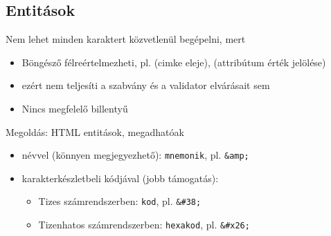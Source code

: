 \subsection{Entitások}

\begin{frame}
  Nem lehet minden karaktert közvetlenül begépelni, mert
  \begin{itemize}
    \item Böngésző félreértelmezheti, pl. \kiemel{\texttt{<}} (cimke eleje),  (attribútum érték jelölése)
    \item ezért nem teljesíti a szabvány és a validator elvárásait sem
    \item Nincs megfelelő billentyű
  \end{itemize}
  Megoldás: HTML entitások, megadhatóak
  \begin{itemize}
    \item névvel (könnyen megjegyezhető): \texttt{\kiemel{\&}mnemonik\kiemel{;}}, pl. \texttt{\&amp;}
    \item karakterkészletbeli kódjával (jobb támogatás): 
    \begin{itemize}
      \item Tizes számrendszerben: \texttt{\kiemel{\&\#}kod\kiemel{;}}, pl. \texttt{\&\#38;}
      \item Tizenhatos számrendszerben: \texttt{hexakod\kiemel{;}}, pl. \texttt{\&\#x26;}
    \end{itemize}
  \end{itemize}
\end{frame}

